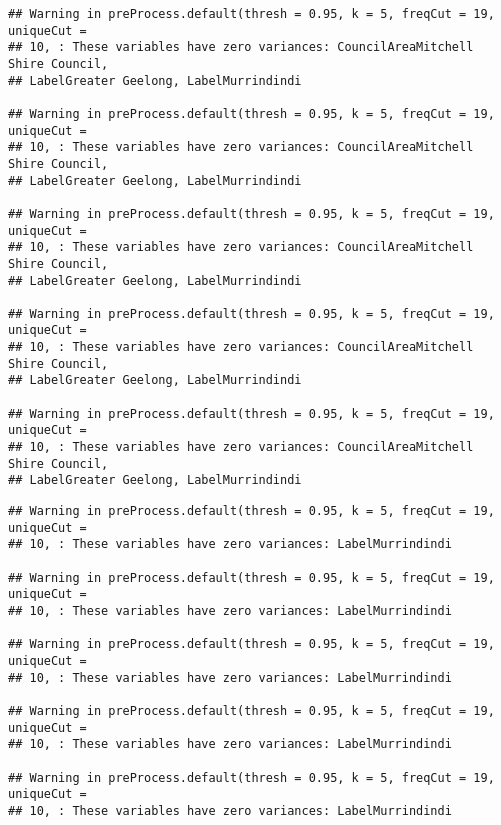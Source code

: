 \documentclass[
]{article}
\begin{document}
\begin{verbatim}
## Warning in preProcess.default(thresh = 0.95, k = 5, freqCut = 19, uniqueCut =
## 10, : These variables have zero variances: CouncilAreaMitchell Shire Council,
## LabelGreater Geelong, LabelMurrindindi

## Warning in preProcess.default(thresh = 0.95, k = 5, freqCut = 19, uniqueCut =
## 10, : These variables have zero variances: CouncilAreaMitchell Shire Council,
## LabelGreater Geelong, LabelMurrindindi

## Warning in preProcess.default(thresh = 0.95, k = 5, freqCut = 19, uniqueCut =
## 10, : These variables have zero variances: CouncilAreaMitchell Shire Council,
## LabelGreater Geelong, LabelMurrindindi

## Warning in preProcess.default(thresh = 0.95, k = 5, freqCut = 19, uniqueCut =
## 10, : These variables have zero variances: CouncilAreaMitchell Shire Council,
## LabelGreater Geelong, LabelMurrindindi

## Warning in preProcess.default(thresh = 0.95, k = 5, freqCut = 19, uniqueCut =
## 10, : These variables have zero variances: CouncilAreaMitchell Shire Council,
## LabelGreater Geelong, LabelMurrindindi
\end{verbatim}

\begin{verbatim}
## Warning in preProcess.default(thresh = 0.95, k = 5, freqCut = 19, uniqueCut =
## 10, : These variables have zero variances: LabelMurrindindi

## Warning in preProcess.default(thresh = 0.95, k = 5, freqCut = 19, uniqueCut =
## 10, : These variables have zero variances: LabelMurrindindi

## Warning in preProcess.default(thresh = 0.95, k = 5, freqCut = 19, uniqueCut =
## 10, : These variables have zero variances: LabelMurrindindi

## Warning in preProcess.default(thresh = 0.95, k = 5, freqCut = 19, uniqueCut =
## 10, : These variables have zero variances: LabelMurrindindi

## Warning in preProcess.default(thresh = 0.95, k = 5, freqCut = 19, uniqueCut =
## 10, : These variables have zero variances: LabelMurrindindi
\end{verbatim}
\end{document}
